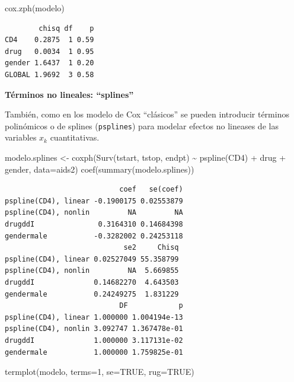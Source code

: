 \documentclass[
]{book}
\newenvironment{Shaded}{\begin{snugshade}}{\end{snugshade}}
\newcommand{\AttributeTok}[1]{\textcolor[rgb]{0.77,0.63,0.00}{#1}}
\newcommand{\ConstantTok}[1]{\textcolor[rgb]{0.00,0.00,0.00}{#1}}
\newcommand{\DecValTok}[1]{\textcolor[rgb]{0.00,0.00,0.81}{#1}}
\newcommand{\FunctionTok}[1]{\textcolor[rgb]{0.00,0.00,0.00}{#1}}
\newcommand{\NormalTok}[1]{#1}
\newcommand{\OtherTok}[1]{\textcolor[rgb]{0.56,0.35,0.01}{#1}}
\newcommand{\SpecialCharTok}[1]{\textcolor[rgb]{0.00,0.00,0.00}{#1}}
\begin{document}
\begin{Shaded}
\begin{Highlighting}[]
\FunctionTok{cox.zph}\NormalTok{(modelo)}
\end{Highlighting}
\end{Shaded}

\begin{verbatim}
        chisq df    p
CD4    0.2875  1 0.59
drug   0.0034  1 0.95
gender 1.6437  1 0.20
GLOBAL 1.9692  3 0.58
\end{verbatim}

\textbf{Términos no lineales: ``splines''}

También, como en los modelo de Cox ``clásicos'' se pueden introducir términos polinómicos o de splines (\texttt{psplines}) para modelar efectos no lineases de las variables \(x_k\) cuantitativas.

\begin{Shaded}
\begin{Highlighting}[]
\NormalTok{modelo.splines }\OtherTok{\textless{}{-}} \FunctionTok{coxph}\NormalTok{(}\FunctionTok{Surv}\NormalTok{(tstart, tstop, endpt) }\SpecialCharTok{\textasciitilde{}} \FunctionTok{pspline}\NormalTok{(CD4) }\SpecialCharTok{+}\NormalTok{ drug }\SpecialCharTok{+}\NormalTok{ gender, }\AttributeTok{data=}\NormalTok{aids2)}
\FunctionTok{coef}\NormalTok{(}\FunctionTok{summary}\NormalTok{(modelo.splines))}
\end{Highlighting}
\end{Shaded}

\begin{verbatim}
                           coef   se(coef)
pspline(CD4), linear -0.1900175 0.02553879
pspline(CD4), nonlin         NA         NA
drugddI               0.3164310 0.14684398
gendermale           -0.3282002 0.24253118
                            se2     Chisq
pspline(CD4), linear 0.02527049 55.358799
pspline(CD4), nonlin         NA  5.669855
drugddI              0.14682270  4.643503
gendermale           0.24249275  1.831229
                           DF            p
pspline(CD4), linear 1.000000 1.004194e-13
pspline(CD4), nonlin 3.092747 1.367478e-01
drugddI              1.000000 3.117131e-02
gendermale           1.000000 1.759825e-01
\end{verbatim}

\begin{Shaded}
\begin{Highlighting}[]
\FunctionTok{termplot}\NormalTok{(modelo, }\AttributeTok{terms=}\DecValTok{1}\NormalTok{, }\AttributeTok{se=}\ConstantTok{TRUE}\NormalTok{, }\AttributeTok{rug=}\ConstantTok{TRUE}\NormalTok{)}
\end{Highlighting}
\end{Shaded}
\end{document}
